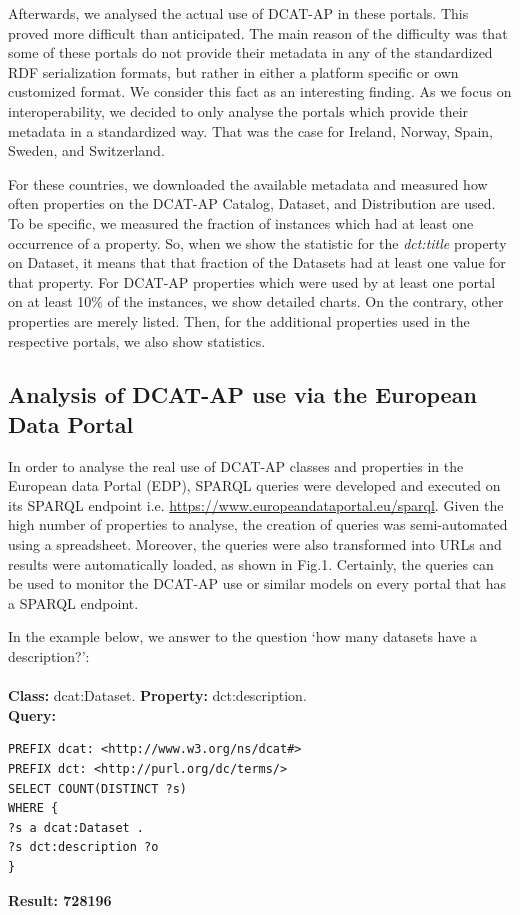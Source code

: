 \documentclass[<options>]{elsarticle}
\begin{document}
Afterwards, we analysed the actual use of DCAT-AP in these portals. This proved more difficult than anticipated. The main reason of the difficulty was that some of these portals do not provide their metadata in any of the standardized RDF serialization formats, but rather in either a platform specific or own customized format. We consider this fact as an interesting finding. As we focus on interoperability, we decided to only analyse the portals which provide their metadata in a standardized way. That was the case for Ireland, Norway, Spain, Sweden, and Switzerland.

For these countries, we downloaded the available metadata and measured how often properties on the DCAT-AP Catalog, Dataset, and Distribution are used. To be specific, we measured the fraction of instances which had at least one occurrence of a property. So, when we show the statistic for the \textit{dct:title} property on Dataset, it means that that fraction of the Datasets had at least one value for that property. For DCAT-AP properties which were used by at least one portal on at least 10\% of the instances, we show detailed charts. On the contrary, other properties are merely listed. Then, for the additional properties used in the respective portals, we also show statistics.

\subsection{Analysis of DCAT-AP use via the European Data Portal}

In order to analyse the real use of DCAT-AP classes and properties in the European data Portal (EDP), SPARQL queries were developed and executed on its SPARQL endpoint i.e. \url{https://www.europeandataportal.eu/sparql}. Given the high number of properties to analyse, the creation of queries was semi-automated using a spreadsheet. Moreover, the queries were also transformed into URLs and results were automatically loaded, as shown in Fig.1. Certainly, the queries can be used to monitor the DCAT-AP use or similar models on every portal that has a SPARQL endpoint.

In the example below, we answer to the question ‘how many datasets have a description?’:
\\
\\
\textbf{Class:} dcat:Dataset. \textbf{Property:} dct:description. \\
\textbf{Query:}
\begin{lstlisting}
PREFIX dcat: <http://www.w3.org/ns/dcat#>
PREFIX dct: <http://purl.org/dc/terms/>
SELECT COUNT(DISTINCT ?s)
WHERE {
?s a dcat:Dataset .
?s dct:description ?o
}
\end{lstlisting}
\textbf{Result: 728196}
\end{document}
